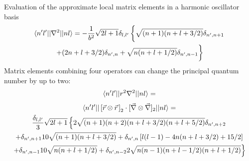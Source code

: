 \begin{section}{Evaluation of the approximate local matrix elements in a harmonic oscillator basis \label{sec:HObasis}}
\begin{multline}
\braket{n'l' || \nabla^2 || nl } =  - \frac{1}{b^2} \sqrt{2l+1}\delta_{l,l'}\left\{\sqrt{(n+1)(n+l+3/2)}\delta_{n',n+1} \vphantom{\frac{1}{1}} \right.\\
\left.+(2n+l+3/2)\delta_{n',n}+\sqrt{n(n+l+1/2)}\delta_{n',n-1}\vphantom{\frac{1}{1}} \right\}
\end{multline}
Matrix elements combining four operators can change the principal quantum number by up to two:
\begin{multline}
\braket{n'l' || r^2 \nabla^2 || nl } =  \\
\end{multline}
\begin{multline}
\braket{n'l' || \left[\vec{r}\otimes\vec{r}\hspace{.5mm}\right]_2\cdot [\vec{\nabla}\otimes\vec{\nabla}]_2 || nl } = \\
\frac{\delta_{l,l'}}{3}\sqrt{2l+1}
\left\{2\sqrt{(n+1)(n+2)(n+l+3/2)(n+l+5/2)}\delta_{n',n+2}\right.\\
+\delta_{n',n+1}10\sqrt{(n+1)(n+l+3/2)}+\delta_{n',n}\left[l(l-1)-4n(n+l+3/2)+15/2\right]\\
\left.+\delta_{n',n-1}10\sqrt{n(n+l+1/2)}+\delta_{n',n-2}2\sqrt{n(n-1)(n+l-1/2)(n+l+1/2)}\right\}
\end{multline}


\end{section}
